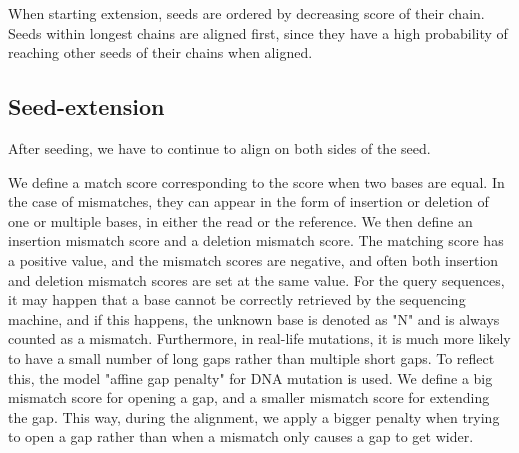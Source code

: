 When starting extension, seeds are ordered by decreasing score of their chain. Seeds within longest chains are aligned first, since they have a high probability of reaching other seeds of their chains when aligned.

\subsection{Seed-extension}
\label{sec:local}
After seeding, we have to continue to align on both sides of the seed. 


We define a match score corresponding to the score when two bases are equal. In the case of mismatches, they can appear in the form of insertion or deletion of one or multiple bases, in either the read or the reference. We then define an insertion mismatch score and a deletion mismatch score. The matching score has a positive value, and the mismatch scores are negative, and often both insertion and deletion mismatch scores are set at the same value. For the query sequences, it may happen that a base cannot be correctly retrieved by the sequencing machine, and if this happens, the unknown base is denoted as "N" and is always counted as a mismatch. Furthermore, in real-life mutations, it is much more likely to have a small number of long gaps rather than multiple short gaps. To reflect this, the model "affine gap penalty" for DNA mutation is used. We define a big mismatch score for opening a gap, and a smaller mismatch score for extending the gap. This way, during the alignment, we apply a bigger penalty when trying to open a gap rather than when a mismatch only causes a gap to get wider. 

